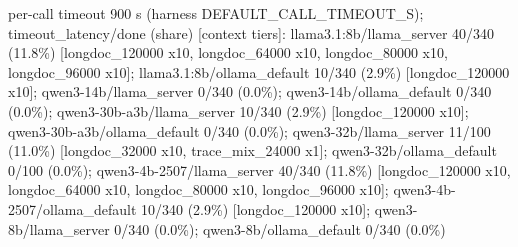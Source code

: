 {\footnotesize\raggedright per-call timeout 900 s (harness DEFAULT\_CALL\_TIMEOUT\_S); timeout\_latency/done (share) [context tiers]: llama3.1:8b/llama\_server 40/340 (11.8\%) [longdoc\_120000 x10, longdoc\_64000 x10, longdoc\_80000 x10, longdoc\_96000 x10]; llama3.1:8b/ollama\_default 10/340 (2.9\%) [longdoc\_120000 x10]; qwen3-14b/llama\_server 0/340 (0.0\%); qwen3-14b/ollama\_default 0/340 (0.0\%); qwen3-30b-a3b/llama\_server 10/340 (2.9\%) [longdoc\_120000 x10]; qwen3-30b-a3b/ollama\_default 0/340 (0.0\%); qwen3-32b/llama\_server 11/100 (11.0\%) [longdoc\_32000 x10, trace\_mix\_24000 x1]; qwen3-32b/ollama\_default 0/100 (0.0\%); qwen3-4b-2507/llama\_server 40/340 (11.8\%) [longdoc\_120000 x10, longdoc\_64000 x10, longdoc\_80000 x10, longdoc\_96000 x10]; qwen3-4b-2507/ollama\_default 10/340 (2.9\%) [longdoc\_120000 x10]; qwen3-8b/llama\_server 0/340 (0.0\%); qwen3-8b/ollama\_default 0/340 (0.0\%)\par}
